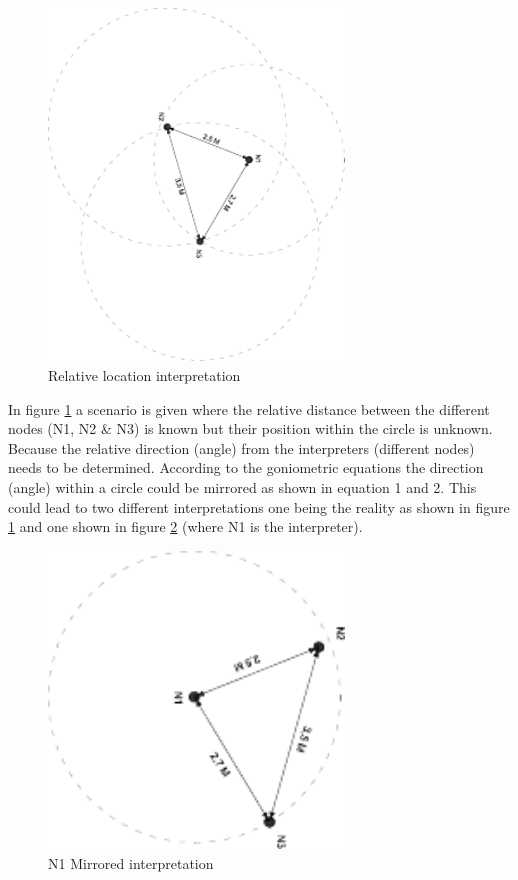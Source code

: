\documentclass[10pt,a4paper]{article}
\begin{document}
\begin{figure}[H]
\centering
\includegraphics[angle=90,width=0.7\textwidth]{Detectie.pdf}
\caption{Relative location interpretation}
\label{detectie}
\end{figure}

In figure \ref{detectie} a scenario is given where the relative distance between the different nodes (N1, N2 \& N3) is known but their position within the circle is unknown. Because the relative direction (angle) from the interpreters (different nodes) needs to be determined. According to the goniometric equations the direction (angle) within a circle could be mirrored as shown in equation 1 and 2. This could lead to two different interpretations one being the reality as shown in figure \ref{detectie} and one shown in figure \ref{mirror} (where N1 is the interpreter). 

\begin{figure}[H]
\centering
\includegraphics[angle=90,width=0.7\textwidth]{Mirror.pdf}
\caption{N1 Mirrored interpretation}
\label{mirror}
\end{figure}
\end{document}
